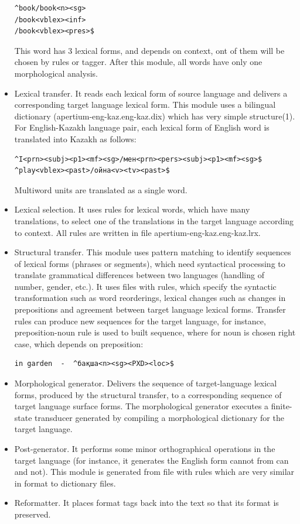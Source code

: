 \documentclass[11pt]{article}
\begin{document}
\begin{itemize}
\begin{verbatim}
^book/book<n><sg>
/book<vblex><inf>
/book<vblex><pres>$
\end{verbatim}
This word has 3 lexical forms, and depends on context, ont of them will be chosen by rules or tagger. After  this module, all words have only one morphological analysis.
\item	Lexical transfer. It reads each lexical form of source language and delivers a corresponding target language lexical form. This module uses a bilingual dictionary (apertium-eng-kaz.eng-kaz.dix) which has very simple structure(1). For English-Kazakh language pair, each lexical form of English word is translated into Kazakh as follows:
\begin{verbatim}
^I<prn><subj><p1><mf><sg>/мен<prn><pers><subj><p1><mf><sg>$ 
^play<vblex><past>/ойна<v><tv><past>$
\end{verbatim}
 Multiword units are translated as a single word.
\item Lexical selection. It uses rules for lexical words, which have many translations, to select one of the translations in the target language according to context. All rules are written in file apertium-eng-kaz.eng-kaz.lrx.
\item Structural transfer. This module uses pattern matching to identify sequences of lexical forms  (phrases or segments), which need syntactical processing to translate grammatical differences between two languages (handling of number, gender, etc.). It uses  files with rules, which specify  the syntactic transformation such as word reorderings, lexical changes such as changes in prepositions and agreement between target language lexical forms. Transfer rules can produce new sequences for the  target language, for instance, preposition-noun rule is used to built sequence, where for noun is chosen right case, which depends on preposition: 
\begin{verbatim}
in garden  -  ^бақша<n><sg><PXD><loc>$
 \end{verbatim} 
\item	 Morphological generator. Delivers the sequence of target-language lexical forms, produced by the structural transfer, to a corresponding sequence of target language surface forms. The morphological generator executes a finite-state transducer generated by compiling a morphological dictionary for the target language.     
\item Post-generator. It performs some minor orthographical operations in the target language (for instance, it generates the English form cannot from can and not). This module is generated from file with rules which are very   similar in format to dictionary files. 
\item Reformatter. It places format tags back into the text so that its format is preserved.
\end{itemize}
\end{document}
